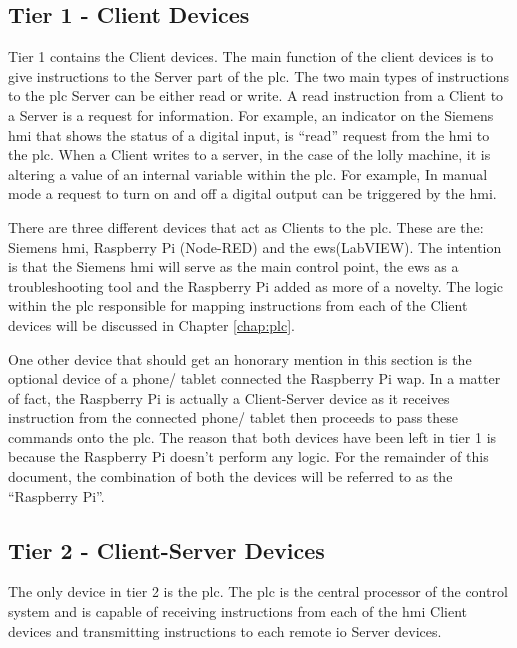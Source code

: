         \subsection{Tier 1 - Client Devices}

        Tier 1 contains the Client devices. The main function of the client devices is to give instructions to the Server part of the \acrshort{plc}. The two main types of instructions to the \acrshort{plc} Server can be either read or write. A read instruction from a Client to a Server is a request for information. For example, an indicator on the Siemens \acrshort{hmi} that shows the status of a digital input, is “read” request from the \acrshort{hmi} to the \acrshort{plc}. When a Client writes to a server, in the case of the lolly machine, it is altering a value of an internal variable within the \acrshort{plc}. For example, In manual mode a request to turn on and off a digital output can be triggered by the \acrshort{hmi}.

        There are three different devices that act as Clients to the \acrshort{plc}. These are the: Siemens \acrshort{hmi}, Raspberry Pi (Node-RED) and the \acrshort{ews}(LabVIEW). The intention is that the Siemens \acrshort{hmi} will serve as the main control point, the \acrshort{ews} as a troubleshooting tool and the Raspberry Pi added as more of a novelty. The logic within the \acrshort{plc} responsible for mapping instructions from each of the Client devices will be discussed in Chapter \ref{chap:plc}.

        One other device that should get an honorary mention in this section is the optional device of a  phone/ tablet connected the Raspberry Pi \acrshort{wap}. In a matter of fact, the Raspberry Pi is actually a Client-Server device as it receives instruction from the connected phone/ tablet then proceeds to pass these commands onto the \acrshort{plc}. The reason that both devices have been left in tier 1 is because the Raspberry Pi doesn’t perform any logic. For the remainder of this document, the combination of both the devices will be referred to as the “Raspberry Pi”.

        \subsection{Tier 2 - Client-Server Devices}

        The only device in tier 2 is the \acrshort{plc}. The \acrshort{plc} is the central processor of the control system and is capable of receiving instructions from each of the \acrshort{hmi} Client devices and transmitting instructions to each remote \acrshort{io} Server devices. 

